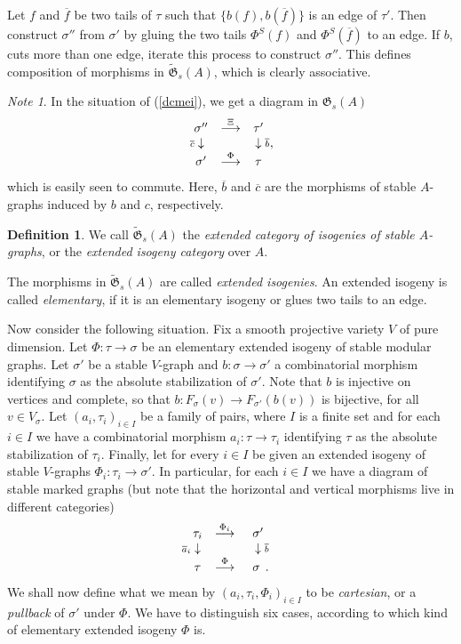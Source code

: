 \documentclass[11pt]{amsart}
\theoremstyle{definition}
\newtheorem{defn}[prop]{Definition}
\theoremstyle{remark}
\newtheorem{note}{Note}\renewcommand{\thenote}{}
\renewcommand{\tilde}{\widetilde}
\newcommand{\GG}{{\mathfrak{G}}}
\newcommand{\ol}{\overline}
\newcommand{\ldiag}[1]
       {\makebox[0cm]{\({\scriptstyle#1}\downarrow\phantom{\scriptstyle#1}\)}}
\newcommand{\rdiag}[1]
       {\makebox[0cm]{\(\phantom{\scriptstyle#1}\downarrow{\scriptstyle#1}\)}}
\newcommand{\comdia}[9]{
\begin{array}{ccc}
#1 & \stackrel{#2}{\longrightarrow} & #3 \\
\ldiag{#4} & #5 & \rdiag{#6} \\
#7 & \stackrel{#8}{\longrightarrow} & #9
\end{array}}
\newcommand{\s}{_{\sigma}}
\theoremstyle{plain}
\theoremstyle{definition}
\theoremstyle{remark}
\begin{document}
Let \(f\) and \(\ol{f}\) be two tails of \(\tau\) such that \(\{b(f),b(\ol{f})\}\) is
an edge of \(\tau'\). Then construct
\(\sigma''\) from \(\sigma'\) by gluing the two tails \(\Phi^S(f)\) and
\(\Phi^S(\ol{f})\) to an edge. If \(b\), cuts more than
one edge, iterate this process to construct \(\sigma''\). This defines
composition of morphisms in \(\tilde{\GG}_s(A)\),
which is clearly associative.

\begin{note}
In the situation of (\ref{dcmei}), we get a diagram in \(\GG_s(A)\)
\[
\comdia{\sigma''}{\Xi}{\tau'}{\ol{c}}{}{\ol{b}}{\sigma'}{\Phi}{\tau},
\]
which is easily seen to commute. Here, \(\ol{b}\) and \(\ol{c}\) are the morphisms
of stable \(A\)-graphs induced by \(b\) and
\(c\), respectively.
\end{note}

\begin{defn} \label{ecisg}
We call \(\tilde{\GG}_s(A)\) the {\em extended category of isogenies of stable
\(A\)-graphs}, or the {\em extended isogeny
category }over \(A\).

The morphisms in \(\tilde{\GG}_s(A)\) are called {\em extended isogenies}. An
extended isogeny is called {\em elementary},
if it is an elementary isogeny or glues two tails to an edge.
\end{defn}

Now consider the following situation. Fix a smooth projective variety \(V\) of
pure dimension. Let
\(\Phi:\tau\rightarrow\sigma\) be an elementary extended isogeny of stable
modular graphs. Let \(\sigma'\) be a stable
\(V\)-graph and \(b:\sigma\rightarrow\sigma'\) a combinatorial morphism identifying
\(\sigma\) as the absolute stabilization
of \(\sigma'\). Note that \(b\) is injective on vertices and complete, so that
\(b:F\s(v)\rightarrow F_{\sigma'}(b(v))\) is
bijective, for all \(v\in V\s\). Let \((a_i,\tau_i)_{i\in I}\) be a family of
pairs, where \(I\) is a finite set and for each
\(i\in I\) we have a combinatorial morphism \(a_i:\tau\rightarrow\tau_i\)
identifying \(\tau\) as the absolute stabilization
of \(\tau_i\). Finally, let for every \(i\in I\) be given an extended isogeny of
stable \(V\)-graphs
\(\Phi_i:\tau_i\rightarrow\sigma'\). In particular, for each \(i\in I\) we have a
diagram of stable marked graphs (but note
that the horizontal and vertical morphisms live in different categories)
\[
\comdia{\tau_i}{\Phi_i}{\sigma'}{\ol{a}_i}{}{\ol{b}}{\tau}{
\Phi}{\phantom{b}\sigma \phantom{b}.}
\]
We shall now define what we mean by \((a_i,\tau_i,\Phi_i)_{i\in I}\) to be {\em
cartesian}, or a {\em pullback } of
\(\sigma'\) under \(\Phi\).  We have to distinguish six cases, according to which
kind of elementary extended isogeny \(\Phi\)
is.
\end{document}
